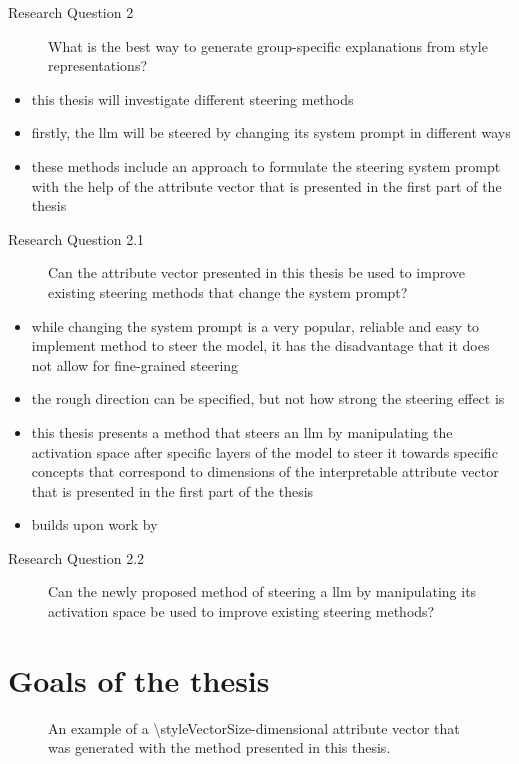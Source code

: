 \begin{description}
  \item[Research Question 2] What is the best way to generate group-specific explanations from style representations? %
\end{description}

\begin{itemize}
  \item this thesis will investigate different steering methods
  \item firstly, the \ac{llm} will be steered by changing its system prompt in different ways
  \item these methods include an approach to formulate the steering system prompt with the help of the attribute vector that is presented in the first part of the thesis
\end{itemize}

\begin{description}
  \item[Research Question 2.1] Can the attribute vector presented in this thesis be used to improve existing steering methods that change the system prompt?
\end{description}

\begin{itemize}
  \item while changing the system prompt is a very popular, reliable and easy to implement method to steer the model, it has the disadvantage that it does not allow for fine-grained steering
  \item the rough direction can be specified, but not how strong the steering effect is
  \item this thesis presents a method that steers an \acs{llm} by manipulating the activation space after specific layers of the model to steer it towards specific concepts that correspond to dimensions of the interpretable attribute vector that is presented in the first part of the thesis
  \item builds upon work by \citet{konenStyleVectorsSteering2024,turnerActivationAdditionSteering2024,rimsky-etal-2024-steering}
\end{itemize}

\begin{description}
  \item[Research Question 2.2] Can the newly proposed method of steering a \ac{llm} by manipulating its activation space be used to improve existing steering methods?
\end{description}

\section{Goals of the thesis}
\label{sec:introduction:goals}


\begin{figure}[ht]
  \begin{center}
    
    \caption{An example of a \num{\styleVectorSize}-dimensional attribute vector that was generated with the method presented in this thesis.} %
  \end{center}
\end{figure}
